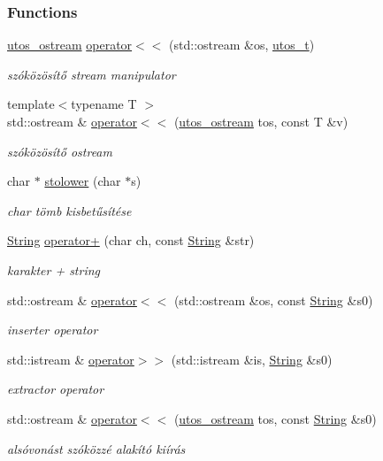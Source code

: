 \subsubsection*{Functions}
\begin{DoxyCompactItemize}
\item 
\mbox{\hyperlink{structutos__ostream}{utos\+\_\+ostream}} \mbox{\hyperlink{schtring_8hpp_a43aac73473ffa53d46bd5f53f0570e3e}{operator$<$$<$}} (std\+::ostream \&os, \mbox{\hyperlink{structutos__t}{utos\+\_\+t}})
\begin{DoxyCompactList}\small\item\em szóközösítő stream manipulator \end{DoxyCompactList}\item 
{\footnotesize template$<$typename T $>$ }\\std\+::ostream \& \mbox{\hyperlink{schtring_8hpp_a89c0d4114f2a28d8ba3812f91ac3d0d2}{operator$<$$<$}} (\mbox{\hyperlink{structutos__ostream}{utos\+\_\+ostream}} tos, const T \&v)
\begin{DoxyCompactList}\small\item\em szóközösítő ostream \end{DoxyCompactList}\item 
char $\ast$ \mbox{\hyperlink{schtring_8hpp_a9d7d0d0ea2b8f0f7c6d53fe66fc0b301}{stolower}} (char $\ast$s)
\begin{DoxyCompactList}\small\item\em char tömb kisbetűsítése \end{DoxyCompactList}\item 
\mbox{\hyperlink{class_string}{String}} \mbox{\hyperlink{schtring_8hpp_a8d89d501f582c3a65df894dbd030bbcf}{operator+}} (char ch, const \mbox{\hyperlink{class_string}{String}} \&str)
\begin{DoxyCompactList}\small\item\em karakter + string \end{DoxyCompactList}\item 
std\+::ostream \& \mbox{\hyperlink{schtring_8hpp_aef14876e55f43fb4ffa7b91664467ecb}{operator$<$$<$}} (std\+::ostream \&os, const \mbox{\hyperlink{class_string}{String}} \&s0)
\begin{DoxyCompactList}\small\item\em inserter operator \end{DoxyCompactList}\item 
std\+::istream \& \mbox{\hyperlink{schtring_8hpp_aea8ed420ad5e70828bc42b0fb9b49366}{operator$>$$>$}} (std\+::istream \&is, \mbox{\hyperlink{class_string}{String}} \&s0)
\begin{DoxyCompactList}\small\item\em extractor operator \end{DoxyCompactList}\item 
std\+::ostream \& \mbox{\hyperlink{schtring_8hpp_a06c0f45780d45c035c1eabecbb34198d}{operator$<$$<$}} (\mbox{\hyperlink{structutos__ostream}{utos\+\_\+ostream}} tos, const \mbox{\hyperlink{class_string}{String}} \&s0)
\begin{DoxyCompactList}\small\item\em alsóvonást szóközzé alakító kiírás \end{DoxyCompactList}\end{DoxyCompactItemize}
